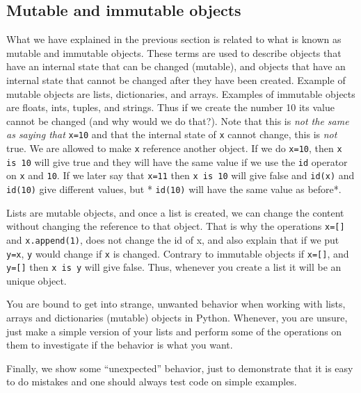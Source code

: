 \documentclass[graybox,sectrefs,envcountresetchap,open=right,final]{svmonodo}
\newenvironment{graybox2admon}[1][]{
\begin{graybox2mdframed}[frametitle=#1]
}
{
\end{graybox2mdframed}
}
\begin{document}
\subsection{Mutable and immutable objects}
What we have explained in the previous section is related to what is known as mutable and immutable objects. These terms are used to describe objects that have an internal state that can be changed (mutable), and objects that have an internal state that cannot be changed after they have been created. Example of mutable objects are lists, dictionaries, and arrays. Examples of immutable objects are floats, ints, tuples, and strings. Thus if we create the number 10 its value cannot be changed (and why would we do that?). Note that this is \emph{not the same as saying that}  \texttt{x=10} and that the internal state of \texttt{x} cannot change, this is \emph{not} true. We are allowed to make \texttt{x} reference another object. If we do \texttt{x=10}, then \texttt{x is 10} will give true and they will have the same value if we use the \texttt{id} operator on \texttt{x} and \texttt{10}. If we later say that \texttt{x=11} then \texttt{x is 10} will give false and \texttt{id(x)} and \texttt{id(10)} give different values, but * \texttt{id(10)} will have the same value as before*.

Lists are mutable objects, and once a list is created, we can change the content without changing the reference to that object. That is why the operations \texttt{x=[]} and \texttt{x.append(1)}, does not change the id of x, and also explain that if we put \texttt{y=x}, \texttt{y} would change if \texttt{x} is changed. Contrary to immutable objects if \texttt{x=[]}, and \texttt{y=[]} then \texttt{x is y} will give false. Thus, whenever you create a list it will be an unique object.    



\begin{graybox2admon}[A final tip]
You are bound to get into strange, unwanted behavior when working with lists, arrays and dictionaries (mutable) objects in Python. Whenever, you are unsure, just make a simple version of your lists and perform some of the operations on them to investigate if the behavior is what you want.
\end{graybox2admon}



Finally, we show some ``unexpected'' behavior, just to demonstrate that it is easy to do mistakes and one should always test code on simple examples. 
\end{document}
